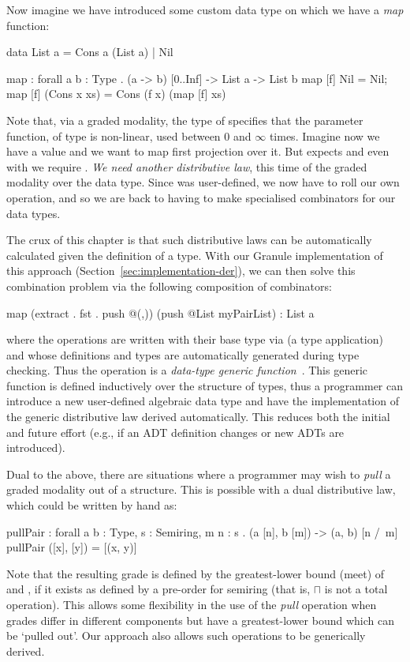 Now imagine we have introduced some custom data type 
on which we have a \emph{map} function:
%
\begin{granule}
data List a = Cons a (List a) | Nil

map : forall { a b : Type } . (a -> b) [0..Inf] -> List a -> List b
map [f] Nil = Nil;
map [f] (Cons x xs) = Cons (f x) (map [f] xs)
\end{granule}
%
Note that, via a graded modality, the type of  specifies that the
parameter function, of type  is non-linear, used between $0$ and
$\infty$ times. Imagine now we have a value  and we want to map first projection over it. But  expects
 and even with  we require . \emph{We need another distributive law}, this time of the graded modality
over the  data type. Since  was user-defined, we now
have to roll our own  operation, and so we are back to having
to make specialised combinators for our data types.

The crux of this chapter is that such distributive laws can be automatically
calculated given the definition of a type. With our Granule implementation of
this approach (Section~\ref{sec:implementation-der}), we can then solve this
combination problem via the following composition of combinators:
%
\begin{granule}
map (extract . fst . push @(,)) (push @List myPairList) : List a
\end{granule}
%
where the  operations are written with their base type via
 (a type application) and whose definitions and types are
automatically generated during type checking. Thus the  operation
is a \textit{data-type generic function}~\citep{hinze2000new}. This generic
function is defined inductively over the structure of types, thus a programmer
can introduce a new user-defined algebraic data type and have the implementation
of the generic distributive law derived automatically. This reduces both the
initial and future effort (e.g., if an ADT definition changes or new ADTs are
introduced).

Dual to the above, there are situations where a programmer may wish to
\emph{pull} a graded modality out of a structure. This is possible with a dual
distributive law, which could be written by hand as:
%
\begin{granule}
pullPair : forall { a b : Type, s : Semiring, m n : s } 
         . (a [n], b [m]) -> (a, b) [n /\ m]
pullPair ([x], [y]) = [(x, y)]
\end{granule}
%
Note that the resulting grade is defined by the greatest-lower bound (meet) of
 and , if it exists as defined by a pre-order for semiring
 (that is, $\sqcap$ is not a total operation). This allows some
flexibility in the use of the \emph{pull} operation when grades differ in
different components but have a greatest-lower bound which can be `pulled out'.
Our approach also allows such operations to be generically derived.

